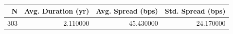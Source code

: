 \begin{tabular}{rrrr}
\toprule
N & Avg. Duration (yr) & Avg. Spread (bps) & Std. Spread (bps) \\
\midrule
303 & 2.110000 & 45.430000 & 24.170000 \\
\bottomrule
\end{tabular}
